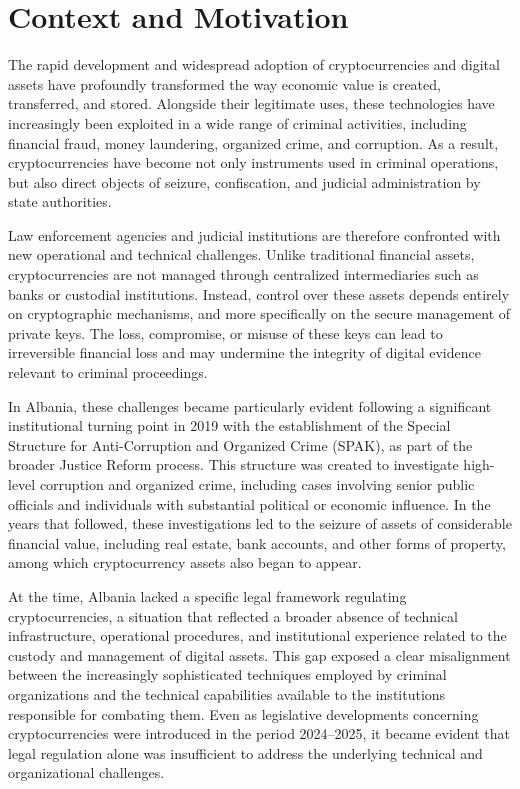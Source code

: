 \documentclass[12pt,a4paper]{report}
\begin{document}
\section{Context and Motivation}
The rapid development and widespread adoption of cryptocurrencies and digital assets have profoundly transformed the way economic value is created, transferred, and stored. Alongside their legitimate uses, these technologies have increasingly been exploited in a wide range of criminal activities, including financial fraud, money laundering, organized crime, and corruption. As a result, cryptocurrencies have become not only instruments used in criminal operations, but also direct objects of seizure, confiscation, and judicial administration by state authorities.

Law enforcement agencies and judicial institutions are therefore confronted with new operational and technical challenges. Unlike traditional financial assets, cryptocurrencies are not managed through centralized intermediaries such as banks or custodial institutions. Instead, control over these assets depends entirely on cryptographic mechanisms, and more specifically on the secure management of private keys. The loss, compromise, or misuse of these keys can lead to irreversible financial loss and may undermine the integrity of digital evidence relevant to criminal proceedings.

In Albania, these challenges became particularly evident following a significant institutional turning point in 2019 with the establishment of the Special Structure for Anti-Corruption and Organized Crime (SPAK), as part of the broader Justice Reform process. This structure was created to investigate high-level corruption and organized crime, including cases involving senior public officials and individuals with substantial political or economic influence. In the years that followed, these investigations led to the seizure of assets of considerable financial value, including real estate, bank accounts, and other forms of property, among which cryptocurrency assets also began to appear.

At the time, Albania lacked a specific legal framework regulating cryptocurrencies, a situation that reflected a broader absence of technical infrastructure, operational procedures, and institutional experience related to the custody and management of digital assets. This gap exposed a clear misalignment between the increasingly sophisticated techniques employed by criminal organizations and the technical capabilities available to the institutions responsible for combating them. Even as legislative developments concerning cryptocurrencies were introduced in the period 2024–2025, it became evident that legal regulation alone was insufficient to address the underlying technical and organizational challenges.
\end{document}
